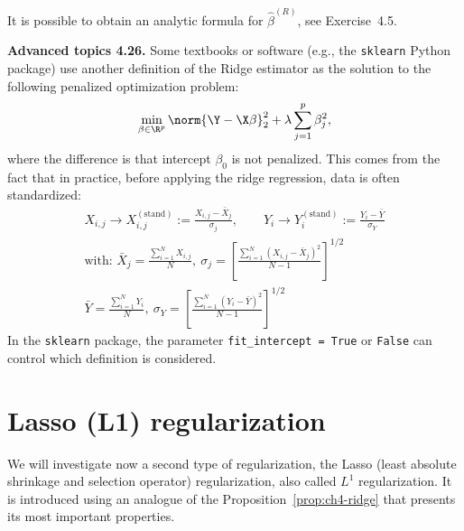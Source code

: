 \begin{remark}
It is possible to obtain an analytic formula for $\widehat{\beta}^{(R)}$, see Exercise~4.5.
\end{remark}

\begin{tcolorbox}[advancedbox]
\textbf{Advanced topics 4.26.} Some textbooks or software (e.g., the \texttt{sklearn} Python package) use another definition of the Ridge estimator as
the solution to the following penalized optimization problem:
\begin{equation}\label{eq:ch4-ridge-sklearn}
\min_{\beta \in \R^p} \norm{\Y - \X \beta}_2^2 + \lambda \sum_{j=1}^p \beta_j^2,
\end{equation}
where the difference is that intercept $\beta_0$ is not penalized. This comes
from the fact that in practice, before applying the ridge regression, data
is often standardized:
\begin{equation}\label{eq:ch4-standardize}
\begin{gathered}
X_{i,j} \to X_{i,j}^{(\mathrm{stand})} := \frac{X_{i,j} - \bar{X}_j}{\sigma_j}, \qquad Y_i \to Y_i^{(\mathrm{stand})} := \frac{Y_i - \bar{Y}}{\sigma_Y} \\
\text{with: } \bar{X}_j = \frac{\sum_{i=1}^N X_{i,j}}{N},\ \sigma_j = \left[ \frac{\sum_{i=1}^N (X_{i,j} - \bar{X}_j)^2}{N - 1} \right]^{1/2} \\
\bar{Y} = \frac{\sum_{i=1}^N Y_i}{N},\ \sigma_Y = \left[ \frac{\sum_{i=1}^N (Y_i - \bar{Y})^2}{N - 1} \right]^{1/2}
\end{gathered}
\end{equation}
In the \texttt{sklearn} package, the parameter \texttt{fit\_intercept = True} or \texttt{False}
can control which definition is considered.
\end{tcolorbox}

\section{Lasso (L1) regularization}\label{sec:ch4-lasso}

We will investigate now a second type of regularization, the Lasso (least absolute shrinkage and selection operator) regularization, also called $L^1$ regularization. It is introduced using an analogue of the Proposition~\ref{prop:ch4-ridge} that presents
its most important properties.

